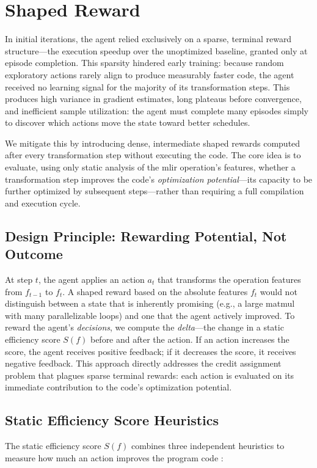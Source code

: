 \section{Shaped Reward}
In initial iterations, the agent relied exclusively on a sparse, terminal reward structure---the execution speedup over the unoptimized baseline, granted only at episode completion. This sparsity hindered early training: because random exploratory actions rarely align to produce measurably faster code, the agent received no learning signal for the majority of its transformation steps. This produces high variance in gradient estimates, long plateaus before convergence, and inefficient sample utilization: the agent must complete many episodes simply to discover which actions move the state toward better schedules.

We mitigate this by introducing dense, intermediate shaped rewards computed after every transformation step without executing the code. The core idea is to evaluate, using only static analysis of the \gls{mlir} operation's features, whether a transformation step improves the code's \textit{optimization potential}---its capacity to be further optimized by subsequent steps---rather than requiring a full compilation and execution cycle.

\subsection{Design Principle: Rewarding Potential, Not Outcome}

At step $t$, the agent applies an action $a_t$ that transforms the operation features from $f_{t-1}$ to $f_t$. A shaped reward based on the absolute features $f_t$ would not distinguish between a state that is inherently promising (e.g., a large matmul with many parallelizable loops) and one that the agent actively improved. To reward the agent's \textit{decisions}, we compute the \textit{delta}---the change in a static efficiency score $S(f)$ before and after the action. If an action increases the score, the agent receives positive feedback; if it decreases the score, it receives negative feedback. This approach directly addresses the credit assignment problem that plagues sparse terminal rewards: each action is evaluated on its immediate contribution to the code's optimization potential.

\subsection{Static Efficiency Score Heuristics}
\label{subsec:static-efficiency-heuristics}
The static efficiency score $S(f)$ combines three independent heuristics to measure how much an action improves the program code :

